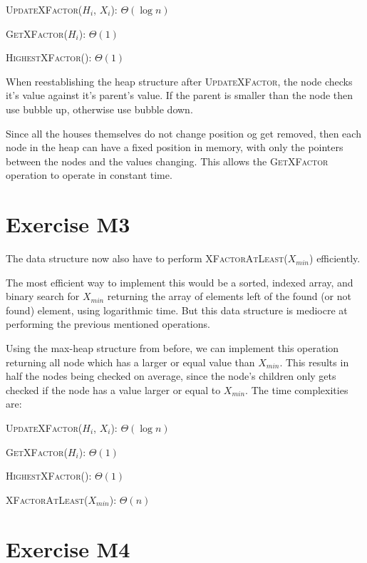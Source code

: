 \documentclass[10pt]{article}
\begin{document}
\begin{center}
\textsc{UpdateXFactor($H_i$, $X_i$)}: $\Theta(\log n)$

\textsc{GetXFactor($H_i$)}: $\Theta(1)$

\textsc{HighestXFactor()}: $\Theta(1)$
\end{center}

When reestablishing the heap structure after \textsc{UpdateXFactor}, the node checks it's value against it's parent's value. If the parent is smaller than the node then use bubble up, otherwise use bubble down.

Since all the houses themselves do not change position og get removed, then each node in the heap can have a fixed position in memory, with only the pointers between the nodes and the values changing. This allows the \textsc{GetXFactor} operation to operate in constant time.

\section*{Exercise M3}

The data structure now also have to perform \textsc{XFactorAtLeast($X_{min}$)} efficiently. 

The most efficient way to implement this would be a sorted, indexed array, and binary search for $X_{min}$ returning the array of elements left of the found (or not found) element, using logarithmic time. But this data structure is mediocre at performing the previous mentioned operations.

Using the max-heap structure from before, we can implement this operation returning all node which has a larger or equal value than $X_{min}$. This results in half the nodes being checked on average, since the node's children only gets checked if the node has a value larger or equal to $X_{min}$. The time complexities are: 

\begin{center}
\textsc{UpdateXFactor($H_i$, $X_i$)}: $\Theta(\log n)$

\textsc{GetXFactor($H_i$)}: $\Theta(1)$

\textsc{HighestXFactor()}: $\Theta(1)$

\textsc{XFactorAtLeast($X_{min}$)}: $\Theta(n)$
\end{center}


\section*{Exercise M4}
\end{document}
